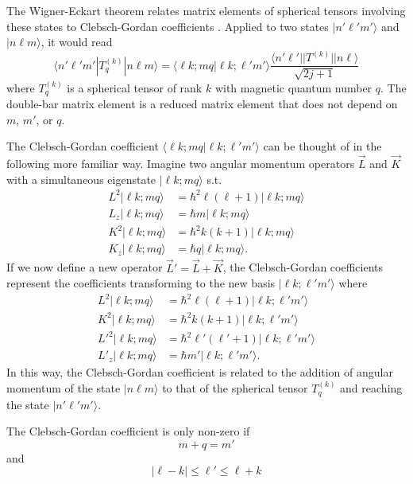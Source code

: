 \documentclass[preprint,12pt]{elsarticle}
\begin{document}
The Wigner-Eckart theorem relates matrix elements of spherical tensors
involving these states to Clebsch-Gordan coefficients
\cite{bib:sakurai}.  Applied to two states $|n'\ell'm'\rangle$ and
$|n\ell m\rangle$, it would read
\begin{equation}
\langle n'\ell'm'|T_q^{(k)}|n\ell m\rangle=\langle\ell k;mq|\ell k;\ell'm'\rangle\frac{\langle n'\ell'||T^{(k)}||n\ell\rangle}{\sqrt{2j+1}}
\end{equation}
where $T_q^{(k)}$ is a spherical tensor of rank $k$ with magnetic
quantum number $q$.  The double-bar matrix element is a reduced matrix
element that does not depend on $m$, $m'$, or $q$.

The Clebsch-Gordan coefficient $\langle\ell k;mq|\ell
k;\ell'm'\rangle$ can be thought of in the following more familiar
way.  Imagine two angular momentum operators $\vec{L}$ and $\vec{K}$
with a simultaneous eigenstate $|\ell k;mq\rangle$ s.t.
\begin{align}
L^2|\ell k;mq\rangle&=\hbar^2\ell(\ell+1)|\ell k;mq\rangle\\
L_z|\ell k;mq\rangle&=\hbar m|\ell k;mq\rangle\\
K^2|\ell k;mq\rangle&=\hbar^2k(k+1)|\ell k;mq\rangle\\
K_z|\ell k;mq\rangle&=\hbar q|\ell k;mq\rangle.
\end{align}
If we now define a new operator $\vec{L}'=\vec{L}+\vec{K}$, the
Clebsch-Gordan coefficients represent the coefficients transforming to
the new basis $|\ell k;\ell'm'\rangle$ where
\begin{align}
L^2|\ell k;mq\rangle&=\hbar^2\ell(\ell+1)|\ell k;\ell'm'\rangle\\
K^2|\ell k;mq\rangle&=\hbar^2k(k+1)|\ell k;\ell'm'\rangle\\
L'^2|\ell k;mq\rangle&=\hbar^2\ell'(\ell'+1)|\ell k;\ell'm'\rangle\\
L'_z|\ell k;mq\rangle&=\hbar m'|\ell k;\ell'm'\rangle.
\end{align}
In this way, the Clebsch-Gordan coefficient is related to the addition
of angular momentum of the state $|n\ell m\rangle$ to that of the
spherical tensor $T_q^{(k)}$ and reaching the state
$|n'\ell'm'\rangle$.

The Clebsch-Gordan coefficient is only non-zero if
\begin{equation}
  \label{eq:z}
  m+q=m'
\end{equation}
and
\begin{equation}
\label{eq:ell}
  |\ell-k|\leq\ell'\leq\ell+k
\end{equation}
\end{document}
